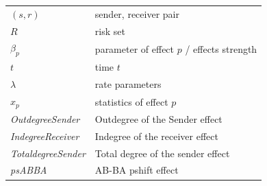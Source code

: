 \documentclass[]{interact}
\theoremstyle{plain}%
\theoremstyle{definition}
\theoremstyle{remark}
\begin{document}
\begin{table}[H]
\begin{tabular}{ll}
    		\textit{$(s,r)$}                                                                                & sender, receiver pair                                         \\
    		\textit{$R$}                                                                                    & risk set                                                      \\
    		\textit{$\beta_p$}                                                                              & parameter of effect $p$ / effects strength                    \\
    		\textit{$t$}                                                                                    & time $t$                                                      \\
    		\textit{$\lambda$}                                                                              & rate parameters                                               \\
    		\textit{$x_p$}                                                                                  & statistics of effect $p$                                      \\
    		\textit{OutdegreeSender}                                                                        & Outdegree of the Sender effect                                \\
    		\textit{IndegreeReceiver}                                                                       & Indegree of the receiver effect                               \\
    		\textit{TotaldegreeSender}                                                                      & Total degree of the sender effect                             \\
    		\textit{psABBA}                                                                                 & AB-BA pshift effect                                           \\

\end{tabular}
\end{table}
\end{document}
